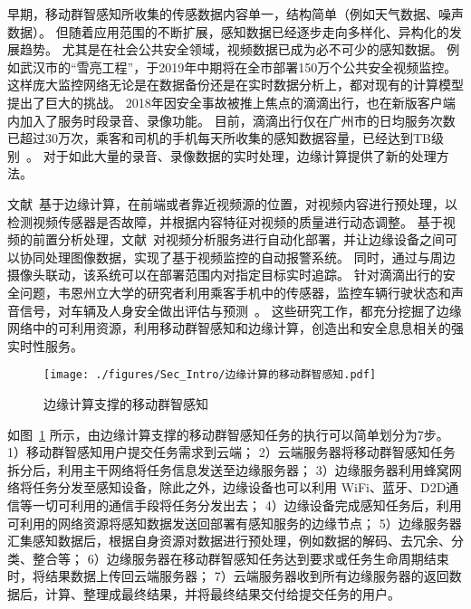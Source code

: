 

早期，移动群智感知所收集的传感数据内容单一，结构简单（例如天气数据、噪声数据）。
但随着应用范围的不断扩展，感知数据已经逐步走向多样化、异构化的发展趋势。
尤其是在社会公共安全领域，视频数据已成为必不可少的感知数据。
例如武汉市的“雪亮工程”，于2019年中期将在全市部署150万个公共安全视频监控。
这样庞大监控网络无论是在数据备份还是在实时数据分析上，都对现有的计算模型提出了巨大的挑战。
2018年因安全事故被推上焦点的滴滴出行，也在新版客户端内加入了服务时段录音、录像功能。
目前，滴滴出行仅在广州市的日均服务次数已超过30万次，乘客和司机的手机每天所收集的感知数据容量，已经达到TB级别~\cite{DBLP:conf/aaai/Yao0KTJLGYL18}。
对于如此大量的录音、录像数据的实时处理，边缘计算提供了新的处理方法。

文献~基于边缘计算，在前端或者靠近视频源的位置，对视频内容进行预处理，以检测视频传感器是否故障，并根据内容特征对视频的质量进行动态调整。
基于视频的前置分析处理，文献~对视频分析服务进行自动化部署，并让边缘设备之间可以协同处理图像数据，实现了基于视频监控的自动报警系统。
同时，通过与周边摄像头联动，该系统可以在部署范围内对指定目标实时追踪。
针对滴滴出行的安全问题，韦恩州立大学的研究者利用乘客手机中的传感器，监控车辆行驶状态和声音信号，对车辆及人身安全做出评估与预测~\cite{DBLP:conf/edge/LiuZQS18}。
这些研究工作，都充分挖掘了边缘网络中的可利用资源，利用移动群智感知和边缘计算，创造出和安全息息相关的强实时性服务。

\begin{figure}[!ht]
  \centering
  \vspace{-1em}
  \texttt{[image: ./figures/Sec\_Intro/边缘计算的移动群智感知.pdf]}
  \vspace{-0.5em}
  \caption{边缘计算支撑的移动群智感知}
  \vspace{-1em}
  \label{Figure_MCS_with_EC}
\end{figure}

如图~\ref{Figure_MCS_with_EC} 所示，由边缘计算支撑的移动群智感知任务的执行可以简单划分为7步。
1）移动群智感知用户提交任务需求到云端；
2）云端服务器将移动群智感知任务拆分后，利用主干网络将任务信息发送至边缘服务器；
3）边缘服务器利用蜂窝网络将任务分发至感知设备，除此之外，边缘设备也可以利用 WiFi、蓝牙、D2D通信等一切可利用的通信手段将任务分发出去；
4）边缘设备完成感知任务后，利用可利用的网络资源将感知数据发送回部署有感知服务的边缘节点；
5）边缘服务器汇集感知数据后，根据自身资源对数据进行预处理，例如数据的解码、去冗余、分类、整合等；
6）边缘服务器在移动群智感知任务达到要求或任务生命周期结束时，将结果数据上传回云端服务器；
7）云端服务器收到所有边缘服务器的返回数据后，计算、整理成最终结果，并将最终结果交付给提交任务的用户。

